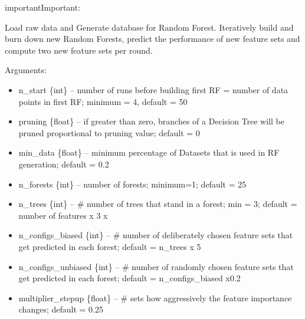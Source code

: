 \documentclass[letterpaper,10pt,english]{sphinxmanual}
\begin{document}
\begin{sphinxadmonition}{important}{Important:}

\begin{fulllineitems}
\label{\detokenize{execution:ForestFire.Main.main_loop}}
Load raw data and Generate database for Random Forest. Iteratively build and burn down new Random Forests, predict the performance of new feature sets and compute two new feature sets per round.

Arguments:
\begin{itemize}
\item {} 
n\_start \{int\} -- number of runs before building first RF = number of data points in first RF; minimum = 4, default = 50

\item {} 
pruning \{float\} -- if greater than zero, branches of a Decision Tree will be pruned proportional to pruning value; default = 0

\item {} 
min\_data \{float\} -- minimum percentage of Datasets that is used in RF generation; default = 0.2

\item {} 
n\_forests \{int\} -- number of forests; minimum=1;  default = 25

\item {} 
n\_trees \{int\} -- \# number of trees that stand in a forest; min = 3; default = number of features x 3 x

\item {} 
n\_configs\_biased \{int\} -- \# number of deliberately chosen feature sets that get predicted in each forest; default = n\_trees x 5

\item {} 
n\_configs\_unbiased \{int\} -- \# number of randomly chosen feature sets that get predicted in each forest; default = n\_configs\_biased x0.2

\item {} 
multiplier\_stepup \{float\} -- \# sets how aggressively the feature importance changes; default = 0.25


\end{itemize}
\end{fulllineitems}
\end{sphinxadmonition}
\end{document}
